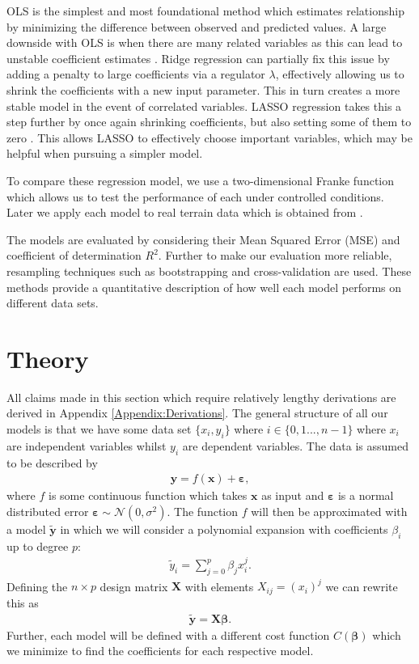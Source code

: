 \documentclass[%
reprint,
amsmath,amssymb,
aps,
pra,
]{revtex4-2}
\begin{document}
OLS is the simplest and most foundational method which estimates relationship by minimizing the difference between observed and predicted values. A large downside with OLS is when there are many related variables as this can lead to unstable coefficient estimates \cite{Bishop2006}. Ridge regression can partially fix this issue by adding a penalty to large coefficients via a regulator $\lambda$, effectively allowing us to shrink the coefficients with a new input parameter. This in turn creates a more stable model in the event of correlated variables. LASSO regression takes this a step further by once again shrinking coefficients, but also setting some of them to zero \cite{hastie01statisticallearning}. This allows LASSO to effectively choose important variables, which may be helpful when pursuing a simpler model.

To compare these regression model, we use a two-dimensional Franke function which allows us to test the performance of each under controlled conditions. Later we apply each model to real terrain data which is obtained from \cite{USGS_EarthExplorer}.

The models are evaluated by considering their Mean Squared Error (MSE) and coefficient of determination $R^2$. Further to make our evaluation more reliable, resampling techniques such as bootstrapping and cross-validation are used. These methods provide a quantitative description of how well each model performs on different data sets.
\section{Theory}
All claims made in this section which require relatively lengthy derivations are derived in Appendix \ref{Appendix:Derivations}. The general structure of all our models is that we have some data set $\{x_i,y_i\}$ where $i\in\{0,1...,n-1\}$ where $x_i$ are independent variables whilst $y_i$ are dependent variables. The data is assumed to be described by
\begin{align}
	\bm y=f(\bm x)+\bm \varepsilon,
	\label{eq:data}
\end{align}
where $f$ is some continuous function which takes $\bm x$ as input and $\bm\varepsilon$ is a normal distributed error $\bm\varepsilon\sim\mathcal{N}(0,\sigma^2)$. The function $f$ will then be approximated with a model $\tilde{\bm y}$ in which we will consider a polynomial expansion with coefficients $\beta_i$ up to degree $p$:
\begin{align}
	\tilde{y}_i=\sum_{j=0}^{p}\beta_j x_i^j.
	\label{eq:model}
\end{align}
Defining the $n\times p$ design matrix $\bm X$ with elements $X_{ij}=(x_i)^j$ we can rewrite this as
\begin{align}
	\tilde{\bm y}=\bm X\bm\beta.
\end{align}
Further, each model will be defined with a different cost function $C(\bm\beta)$ which we minimize to find the coefficients for each respective model.
\end{document}
